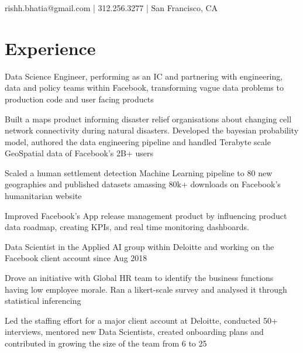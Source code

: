 \documentclass[]{deedy-resume-reversed}
\begin{document}
%
%

%
%
 {rishh.bhatia@gmail.com | 312.256.3277 | San Francisco, CA}
%
%

\begin{minipage}[t]{0.66\textwidth}


\section{Experience}
\vspace{\topsep} %
\begin{tightemize}
\item Data Science Engineer, performing as an IC and partnering with engineering, data and policy teams within Facebook, transforming vague data problems to production code and user facing products
\item Built a maps product informing disaster relief organisations about changing cell network connectivity during natural disasters. Developed the bayesian probability model, authored the data engineering pipeline and handled Terabyte scale GeoSpatial data of Facebook's 2B+ users
\item Scaled a human settlement detection Machine Learning pipeline to 80 new geographies and published datasets amassing 80k+ downloads on Facebook's humanitarian website 
\item Improved Facebook's App release management product by influencing product data roadmap, creating KPIs, and real time monitoring dashboards. 
\end{tightemize}
\sectionsep
\sectionsep

\begin{tightemize}
\item Data Scientist in the Applied AI group within Deloitte and working on the Facebook client account since Aug 2018
\item Drove an initiative with Global HR team to identify the business functions having low employee morale. Ran a likert-scale survey and analysed it through statistical inferencing
\item Led the staffing effort for a major client account at Deloitte, conducted 50+ interviews, mentored new Data Scientists, created onboarding plans and contributed in growing the size of the team from 6 to 25
\end{tightemize}
\sectionsep
\sectionsep


\end{minipage}
\end{document}

